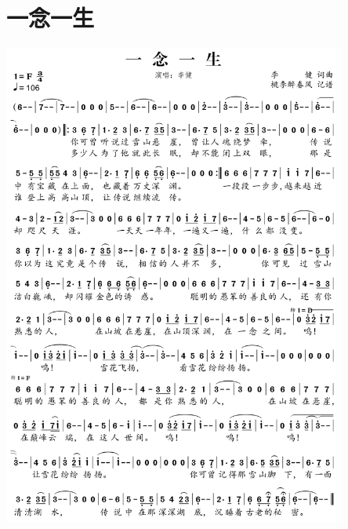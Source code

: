\documentclass[cn,pad,twocol]{elegantbook}
\begin{document}
\section{一念一生} \includegraphics[width=0.85\textwidth]{rpi400/20210212李健一念一生.png}
\end{document}
